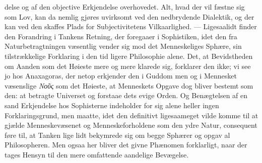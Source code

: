 \documentclass[12pt,a4paper]{book}
\newcommand{\gk}[1]{\textit{#1}}
\begin{document}
delse og af den objective Erkjendelse overhovedet. Alt, hvad
der vil fæstne sig som Lov, kan da nemlig gjøres uvirksomt
ved den nedbrydende Dialektik, og der kan ved den skaffes
Plads for Subjectivitetens Vilkaarlighed. --- Ligesaalidt finder
den Forandring i Tankens Retning, der foregaaer i Sophistiken,
idet den fra Naturbetragtningen væsentlig vender sig mod det
Menneskeliges Sphære, sin tilstrækkelige Forklaring i den tid\-%
ligere Philosophie alene. Det, at Bevidstheden om Aanden
som det Høieste mere og mere klarede sig, forklarer den ikke;
vi see jo hos Anaxagoras, der netop erkjender den i Guddom\-%
men og i Mennesket væsenslige \gk{Νοῦς} som det Høieste, at
Menneskets Opgave dog bliver bestemt som den: at betragte
Universet og forstaae dets evige Orden. Og Benægtelsen af
en sand Erkjendelse hos Sophisterne indeholder for sig alene
heller ingen Forklaringsgrund, men maatte, idet den definitivt
ligesaameget vilde komme til at gjælde Menneskevæsenet og
Menneskeforholdene som den ydre Natur, consequent føre til,
at Tanken lige lidt bekymrede sig om begge Sphærer og opgav
al Philosopheren. Men ogsaa her bliver det givne Phænomen
forklarligt, naar der tages Hensyn til den mere omfattende
aandelige Bevægelse.
\end{document}
